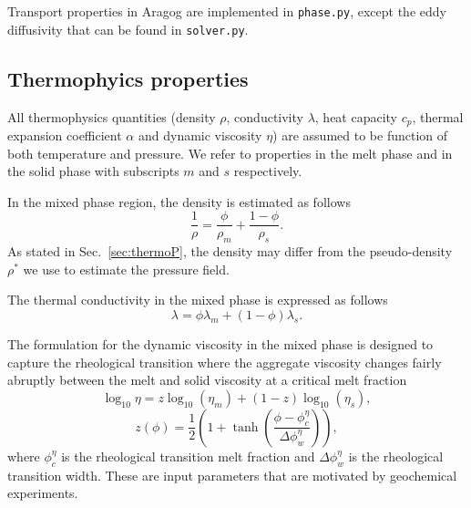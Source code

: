 \documentclass{article}
\begin{document}
Transport properties in Aragog are implemented in \texttt{phase.py}, except the eddy diffusivity that can be found in \texttt{solver.py}.

\subsection{Thermophyics properties}

All thermophysics quantities (density $\rho$, conductivity $\lambda$, heat capacity $c_p$, thermal expansion coefficient $\alpha$ and dynamic viscosity $\eta$) are assumed to be function of both temperature and pressure. We refer to properties in the melt phase and in the solid phase with subscripts $m$ and $s$ respectively.

In the mixed phase region, the density is estimated as follows
\begin{equation}
    \frac{1}{\rho}=\frac{\phi}{\rho_m}+\frac{1-\phi}{\rho_s}.
\end{equation}
As stated in Sec.~\ref{sec:thermoP}, the density may differ from the pseudo-density $\rho^*$ we use to estimate the pressure field.

The thermal conductivity in the mixed phase is expressed as follows
\begin{equation}
    \lambda = \phi \lambda_m + (1-\phi)\lambda_s.
\end{equation}

The formulation for the dynamic viscosity in the mixed phase is designed to capture the rheological transition where the aggregate viscosity changes fairly abruptly between the melt and solid viscosity at a critical melt fraction~\cite{BSW18}
\begin{equation}
    \log_{10} \eta = z\log_{10}(\eta_m) + (1-z)\log_{10}(\eta_s),
\end{equation}
\begin{equation}
    z(\phi)=\frac{1}{2}\left(1+\tanh\left( \frac{\phi-\phi_c^\eta}{\Delta\phi_w^\eta}\right) \right),
\end{equation}
where $\phi_c^\eta$ is the rheological transition melt fraction and $\Delta \phi_w^\eta$ is the rheological transition width. These are input parameters that are motivated by geochemical experiments.
\end{document}
